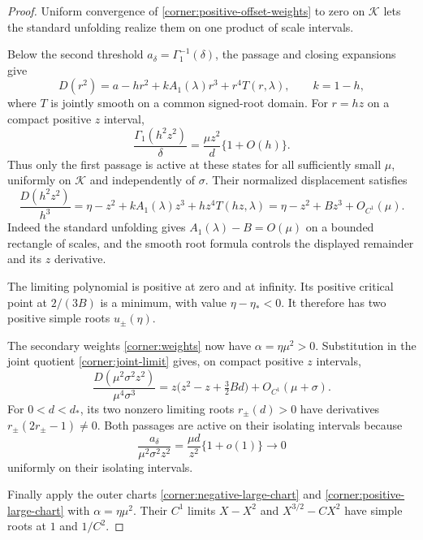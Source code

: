 \begin{proof}
Uniform convergence of \eqref{corner:positive-offset-weights} to zero
on $\mathcal K$ lets the standard unfolding realize them on one
product of scale intervals.

Below the second threshold $a_\delta=\Gamma_1^{-1}(\delta)$, the passage
and closing expansions give
\begin{equation}\label{corner:positive-first-only-identity}
 D(r^2)=a-hr^2+kA_1(\lambda)r^3+r^4T(r,\lambda),
 \qquad k=1-h,
\end{equation}
where $T$ is jointly smooth on a common signed-root domain.
For $r=hz$ on a compact positive $z$ interval,
\[
 \frac{\Gamma_1(h^2z^2)}{\delta}
   =\frac{\mu z^2}{d}\{1+O(h)\}.
\]
Thus only the first passage is active at these states for all sufficiently
small $\mu$,
uniformly on $\mathcal K$ and independently of $\sigma$. Their
normalized displacement satisfies
\begin{equation}\label{corner:positive-first-only-limit}
 \frac{D(h^2z^2)}{h^3}
 =\eta-z^2+kA_1(\lambda)z^3+hz^4T(hz,\lambda)
 =\eta-z^2+Bz^3+O_{C^1}(\mu).
\end{equation}
Indeed the standard unfolding gives $A_1(\lambda)-B=O(\mu)$ on a bounded
rectangle of scales, and the smooth root formula controls the displayed
remainder and its $z$ derivative.

The limiting polynomial is positive at zero and at infinity.
Its positive critical point at $2/(3B)$ is a minimum, with value
$\eta-\eta_*<0$.
It therefore has two positive simple roots $u_\pm(\eta)$.

The secondary weights \eqref{corner:weights} now have
$\alpha=\eta\mu^2>0$. Substitution in the joint quotient
\eqref{corner:joint-limit} gives, on compact positive $z$ intervals,
\begin{equation}\label{corner:positive-secondary-limit}
 \frac{D(\mu^2\sigma^2z^2)}{\mu^4\sigma^3}
 =z\bigl(z^2-z+\tfrac32Bd\bigr)+O_{C^1}(\mu+\sigma).
\end{equation}
For $0<d<d_*$, its two nonzero limiting roots $r_\pm(d)>0$ have
derivatives $r_\pm(2r_\pm-1)\ne0$. Both passages are active on their
isolating intervals because
\[
 \frac{a_\delta}{\mu^2\sigma^2z^2}
   =\frac{\mu d}{z^2}\{1+o(1)\}\longrightarrow0
\]
uniformly on their isolating intervals.

Finally apply the outer charts
\eqref{corner:negative-large-chart} and
\eqref{corner:positive-large-chart} with $\alpha=\eta\mu^2$.
Their $C^1$ limits $X-X^2$ and $X^{3/2}-CX^2$ have simple roots at
$1$ and $1/C^2$.


\end{proof}
